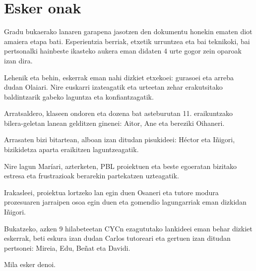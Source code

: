 \chapter*{Esker onak}
Gradu bukaerako lanaren garapena jasotzen den dokumentu honekin ematen diot amaiera etapa bati. Esperientzia berriak, etxetik urruntzea eta bai teknikoki, bai pertsonalki hainbeste ikasteko aukera eman didaten 4 urte gogor zein oparoak izan dira.  

Lehenik eta behin, eskerrak eman nahi dizkiet etxekoei: gurasoei eta arreba dudan Olaiari. Nire euskarri izateagatik eta urteetan zehar erakutsitako baldintzarik gabeko laguntza eta konfiantzagatik.

Arratsaldero, klaseen ondoren eta dozena bat asteburutan 11. eraikuntzako bilera-geletan lanean gelditzen ginenei: Aitor, Ane eta bereziki Oihaneri. 

Arrasaten bizi bitartean, alboan izan ditudan pisukideei: Héctor eta Iñigori, bizikidetza aparta eraikitzen laguntzeagatik. 

Nire lagun Maríari, azterketen, PBL proiektuen eta beste egoeratan bizitako estresa eta frustrazioak berarekin partekatzen uzteagatik.

Irakasleei, proiektua lortzeko lan egin duen Osaneri eta tutore modura prozesuaren jarraipen osoa egin duen eta gomendio lagungarriak eman dizkidan Iñigori.

Bukatzeko, azken 9 hilabeteetan CYCn ezagututako lankideei eman behar dizkiet eskerrak, beti eskura izan dudan Carlos tutoreari eta gertuen izan ditudan pertsonei: Mireia, Edu, Beñat eta Davidi.

Mila esker denoi.
